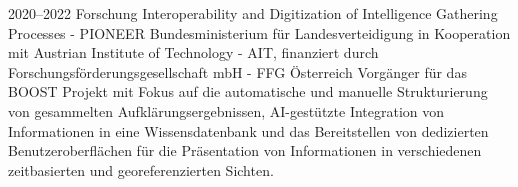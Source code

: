 \cventry
{2020--2022}
{Forschung}
{Interoperability and Digitization of Intelligence Gathering Processes - PIONEER}
{
  Bundesministerium für Landesverteidigung
  in Kooperation mit Austrian Institute of Technology - AIT,
  finanziert durch Forschungsförderungsgesellschaft mbH - FFG
}
{Österreich}
{
  Vorgänger für das BOOST Projekt mit Fokus auf die automatische und manuelle
  Strukturierung von gesammelten Aufklärungsergebnissen, AI-gestützte Integration
  von Informationen in eine Wissensdatenbank und das Bereitstellen von dedizierten
  Benutzeroberflächen für die Präsentation von Informationen in verschiedenen
  zeitbasierten und georeferenzierten Sichten.
}
